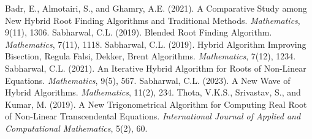 \documentclass[amsmath, amssymb, aps]{revtex4-2}
\begin{document}
\begin{thebibliography}{99}
 Badr, E., Almotairi, S., and Ghamry, A.E. (2021). A Comparative Study among New Hybrid Root Finding Algorithms and Traditional Methods. \textit{Mathematics}, 9(11), 1306.
 Sabharwal, C.L. (2019). Blended Root Finding Algorithm. \textit{Mathematics}, 7(11), 1118.
 Sabharwal, C.L. (2019). Hybrid Algorithm Improving Bisection, Regula Falsi, Dekker, Brent Algorithms. \textit{Mathematics}, 7(12), 1234.
 Sabharwal, C.L. (2021). An Iterative Hybrid Algorithm for Roots of Non-Linear Equations. \textit{Mathematics}, 9(5), 567.
 Sabharwal, C.L. (2023). A New Wave of Hybrid Algorithms. \textit{Mathematics}, 11(2), 234.
 Thota, V.K.S., Srivastav, S., and Kumar, M. (2019). A New Trigonometrical Algorithm for Computing Real Root of Non-Linear Transcendental Equations. \textit{International Journal of Applied and Computational Mathematics}, 5(2), 60.

\end{thebibliography}
\end{document}
